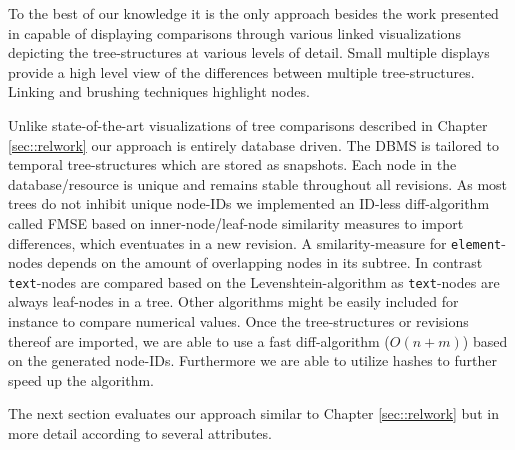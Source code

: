 To the best of our knowledge it is the only approach besides the work presented in \cite{bremm2011interactive} capable of displaying comparisons through various linked visualizations depicting the tree-structures at various levels of detail. Small multiple displays provide a high level view of the differences between multiple tree-structures. Linking and brushing techniques highlight nodes. %

Unlike state-of-the-art visualizations of tree comparisons described in Chapter \ref{sec::relwork} our approach is entirely database driven. The DBMS is tailored to temporal tree-structures which are stored as snapshots. Each node in the database/resource is unique and remains stable throughout all revisions. As most trees do not inhibit unique node-IDs we implemented an ID-less diff-algorithm called FMSE based on inner-node/leaf-node similarity measures to import differences, which eventuates in a new revision. A smilarity-measure for \texttt{element}-nodes depends on the amount of overlapping nodes in its subtree. In contrast \texttt{text}-nodes are compared based on the Levenshtein-algorithm as \texttt{text}-nodes are always leaf-nodes in a tree. Other algorithms might be easily included for instance to compare numerical values. Once the tree-structures or revisions thereof are imported, we are able to use a fast diff-algorithm ($O(n+m)$) based on the generated node-IDs. Furthermore we are able to utilize hashes to further speed up the algorithm.
 
The next section evaluates our approach similar to Chapter \ref{sec::relwork} but in more detail according to several attributes.

